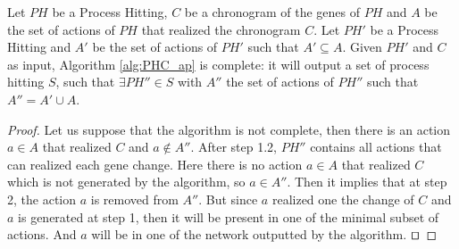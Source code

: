 %

\begin{theorem}[Completeness]%
	\label{th:correct}
	Let $PH$ be a Process Hitting, $C$ be a chronogram of the genes of $PH$ and $A$ be the set of actions of $PH$ that realized the chronogram $C$.
	Let $PH'$ be a Process Hitting and $A'$ be the set of actions of $PH'$ such that $A' \subseteq A$.
	Given $PH'$ and $C$ as input, Algorithm \ref{alg:PHC_ap} is complete:
	it will output a set of process hitting $S$,
	such that $\exists PH'' \in S$ with $A''$ the set of actions of $PH''$ such that $A'' = A' \cup A$.
	\begin{proof}
	Let us suppose that the algorithm is not complete, then there is an action $a \in A$ that realized $C$ and $a \not \in A''$.
	After step 1.2, $PH''$ contains all actions that can realized each gene change.
	Here there is no action $a \in A$ that realized $C$ which is not generated by the algorithm, so $a \in A''$.
	Then it implies that at step 2, the action $a$ is removed from $A''$.
	But since $a$ realized one the change of $C$ and $a$ is generated at step 1, then it will be present in one of the minimal subset of actions.
	And $a$ will be in one of the network outputted by the algorithm.
	$\qed$
	\end{proof}
\end{theorem}



